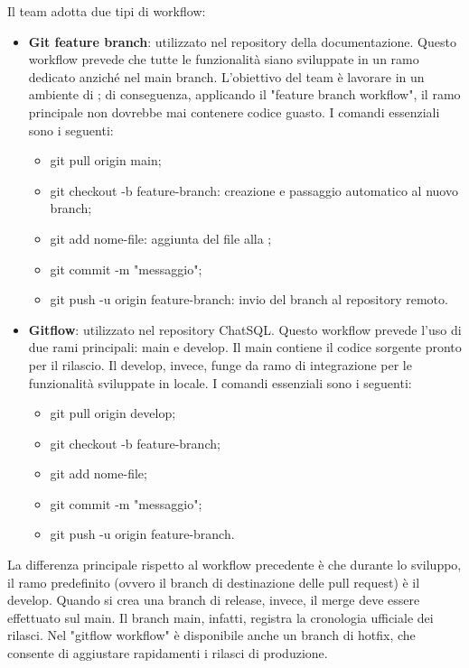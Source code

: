 \par Il team adotta due tipi di workflow:
\begin{itemize}
  \item \textbf{Git feature branch}: utilizzato nel repository della documentazione. Questo workflow prevede che tutte le funzionalità siano sviluppate in un ramo dedicato anziché nel main branch. L'obiettivo del team è lavorare in un ambiente di ; di conseguenza, applicando il "feature branch workflow", il ramo principale non dovrebbe mai contenere codice guasto. I comandi essenziali sono i seguenti:
  \begin{itemize}
    \item git pull origin main;
    \item git checkout -b feature-branch: creazione e passaggio automatico al nuovo branch;
    \item git add nome-file: aggiunta del file alla ;
    \item git commit -m "messaggio";
    \item git push -u origin feature-branch: invio del branch al repository remoto.
  \end{itemize}
  \item \textbf{Gitflow}: utilizzato nel repository ChatSQL. Questo workflow prevede l'uso di due rami principali: main e develop. Il main contiene il codice sorgente pronto per il rilascio. Il develop, invece, funge da ramo di integrazione per le funzionalità sviluppate in locale. I comandi essenziali sono i seguenti:
  \begin{itemize}
    \item git pull origin develop;
    \item git checkout -b feature-branch;
    \item git add nome-file;
    \item git commit -m "messaggio";
    \item git push -u origin feature-branch.
  \end{itemize}
\end{itemize}
\par La differenza principale rispetto al workflow precedente è che durante lo sviluppo, il ramo predefinito (ovvero il branch di destinazione delle pull request) è il develop. Quando si crea una branch di release, invece, il merge deve essere effettuato sul main. Il branch main, infatti, registra la cronologia ufficiale dei rilasci. Nel "gitflow workflow" è disponibile anche un branch di hotfix, che consente di aggiustare rapidamenti i rilasci di produzione.
